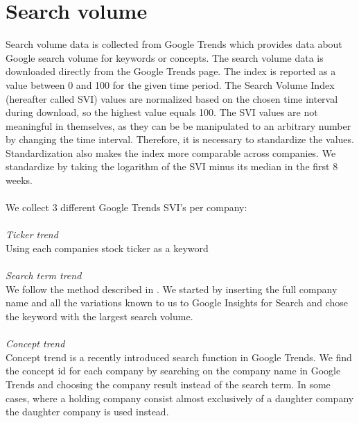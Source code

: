 \section{Search volume}\label{sec:search volume}
Search volume data is collected from Google Trends which provides data about Google search volume for keywords or concepts. The search volume data is downloaded directly from the Google Trends page. The index is reported as a value between 0 and 100 for the given time period. The Search Volume Index (hereafter called SVI) values are normalized based on the chosen time interval during download, so the highest value equals 100. The SVI values are not meaningful in themselves, as they can be be manipulated to an arbitrary number by changing the time interval. Therefore, it is necessary to standardize the values. Standardization also makes the index more comparable across companies. We standardize by taking the logarithm of the SVI minus its median in the first 8 weeks. 
\\\\
We collect 3 different Google Trends SVI's per company:
\\\\
\textit{Ticker trend}
\\
Using each companies stock ticker as a keyword
\\\\
\textit{Search term trend}
\\
We follow the method described in  \cite{vlastakis}. We started by inserting the full company name and all the variations known to us to Google Insights for Search and chose the keyword with the largest search volume.
\\\\
\textit{Concept trend}
\\
Concept trend is a recently introduced search function in Google Trends. We find the concept id for each company by searching on the company name in Google Trends and choosing the company result instead of the search term. In some cases, where a holding company consist almost exclusively of a daughter company the daughter company is used instead.
\\\\

